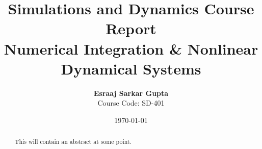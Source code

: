 \documentclass[11pt,a4paper]{article}
\title{\textbf{Simulations and Dynamics Course Report}\\ \large Numerical Integration \& Nonlinear Dynamical Systems}
\author{\textbf{Esraaj Sarkar Gupta} \\ Course Code: SD-401}
\date{\today}
\begin{document}
\maketitle

\begin{abstract}
This will contain an abstract at some point.
\end{abstract}




















\end{document}
